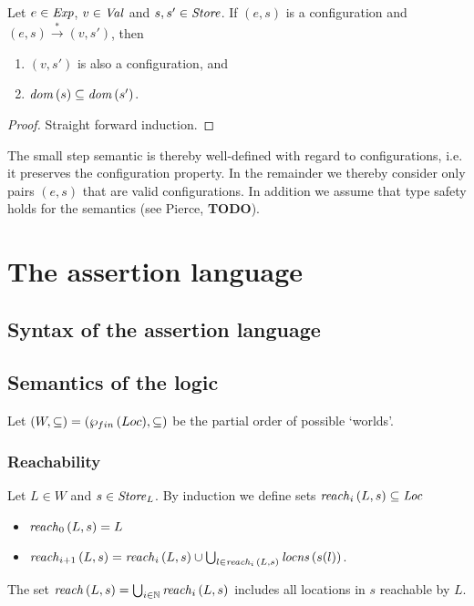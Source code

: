 \documentclass[12pt,a4paper]{report}
\begin{document}
\begin{corollary}
  Let $e\in\mathit{Exp}$, $v\in\mathit{Val}$ and $s,s'\in\mathit{Store}$. If $(e,s)$ is a configuration
  and $(e,s) \xrightarrow* (v,s')$, then
  \begin{enumerate}
    \item $(v,s')$ is also a configuration, and
    \item $\mathit{dom}\,(s) \subseteq \mathit{dom}\,(s')$.
  \end{enumerate}
\end{corollary}

\begin{proof}
  Straight forward induction.
\end{proof}

The small step semantic is thereby well-defined with regard to configurations, i.e. it preserves
the configuration property. In the remainder
we thereby consider only pairs $(e,s)$ that are valid configurations. In addition we
assume that type safety holds for the semantics (see Pierce, {\bf TODO}).



\chapter{The assertion language}



\section{Syntax of the assertion language}



\section{Semantics of the logic}

Let $(W,\subseteq) = (\wp_{fin}\,(Loc),\subseteq)$ be the partial order of possible `worlds'.



\subsection{Reachability}

\begin{definition}[Reachability]
  Let $L\in W$ and $s\in\mathit{Store}_L$. By induction we define sets $\mathit{reach}_{i}\,(L,s) \subseteq \mathit{Loc}$
  \begin{itemize}
    \item $\mathit{reach}_{0}\,(L,s) = L$
    \item $\mathit{reach}_{i+1}\,(L,s) = \mathit{reach}_{i}\,(L,s) \cup \bigcup_{l\in\mathit{reach}_{i}\,(L,s)} \mathit{locns}\,(s(l))$.
  \end{itemize}
  The set $\mathit{reach}\,(L,s) = \bigcup_{i\in\mathbb N} \mathit{reach}_{i}\,(L,s)$ includes all locations in $s$ reachable
  by $L$.
\end{definition}
\end{document}
